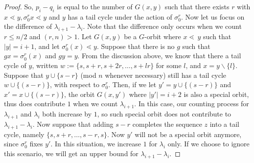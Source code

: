 \documentclass[10 pt]{amsart}
\theoremstyle{plain}
\theoremstyle{definition}
\theoremstyle{remark}
\numberwithin{equation}{section}
\theoremstyle{remark}
\newcommand{\minus}{\backslash}
\begin{document}
\begin{proof}
So, $p_i - q_i$ is equal to the number of $G(x, y)$ such that there exists $r$ with $x\lessdot y,\sigma_0^r x \lessdot y$ and $y$ has a tail cycle under the action of $\sigma_0^r$. Now let us focus on the difference of $\lambda_{i+1} - \lambda_{i}$.  Note that the difference only occurs  when we count $r \le n/2$ and $(r, n) > 1$. Let $G{(x , y)}$ be a $G$-orbit where $x \lessdot \, y$ such that $|y| = i+1$, and let $\sigma_0^{r} (x) \lessdot  y.$ Suppose that there is no $g$ such that $g x = \sigma_0 ^r (x)$ and $gy = y$. From the discussion above, we know that there a tail cycle of $y$, written $w := \{s,s+r,s+2r,\ldots,s+lr\}$  for some $l $, and $x = y \minus \{l\} $. Suppose that $y \cup \{s-r\}$ (mod $n$ whenever necessary) still has a tail cycle $w \cup \{(s - r)\}$, with respect to $\sigma_0^r.$ Then, if we let  $y' = y \cup \{(s - r) \} $ and $x' = x \cup \{(s -r)\}$, the orbit $G{(x, y')}$ where $|y'| = i+2$ is also a special orbit, thus does contribute $1$ when we count $\lambda_{i+1}$.  In this case, our counting process for $\lambda_{i+1}$ and $\lambda_{i}$ both increase by $1$, so such special orbit does not contribute to $\lambda_{i+1} - \lambda_{i}$.  Now suppose that adding $s -r$ completes the sequence $z$ into a tail cycle, namely $\{s,s+r,\ldots,s-r, s\}$. Now $y'$ will not be a special orbit anymore, since $\sigma_0^r $ fixes $y'$. In this situation,  we increase  $1$ for $\lambda_i$ only.  If we choose to ignore this scenario, we will get an upper bound for $\lambda_{i+1} - \lambda_i$. 


\end{proof}
\end{document}
